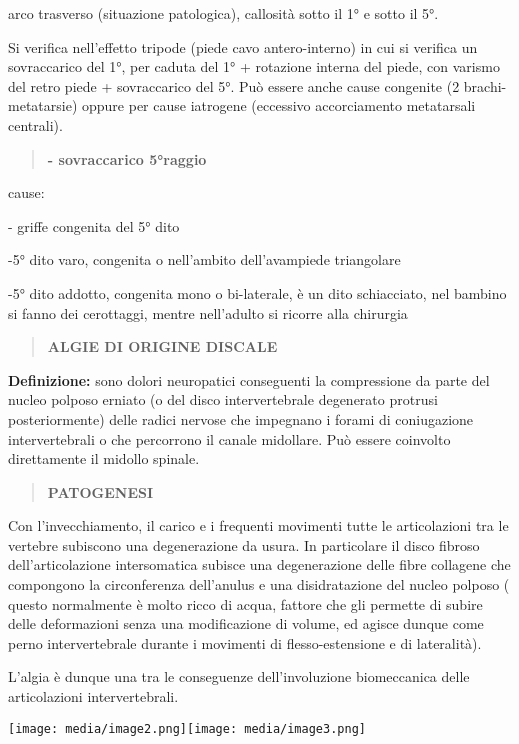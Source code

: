 \documentclass[]{article}
\begin{document}
arco trasverso (situazione patologica), callosità sotto il 1° e sotto il
5°.

Si verifica nell'effetto tripode (piede cavo antero-interno) in cui si
verifica un sovraccarico del 1°, per caduta del 1° + rotazione interna
del piede, con varismo del retro piede + sovraccarico del 5°. Può essere
anche cause congenite (2 brachi-metatarsie) oppure per cause iatrogene
(eccessivo accorciamento metatarsali centrali).

\begin{quote}
\textbf{- sovraccarico 5°raggio}
\end{quote}

cause:

- griffe congenita del 5° dito

-5° dito varo, congenita o nell'ambito dell'avampiede triangolare

-5° dito addotto, congenita mono o bi-laterale, è un dito schiacciato,
nel bambino si fanno dei cerottaggi, mentre nell'adulto si ricorre alla
chirurgia

\begin{quote}
\textbf{ALGIE DI ORIGINE DISCALE}
\end{quote}

\textbf{Definizione:} sono dolori neuropatici conseguenti la
compressione da parte del nucleo polposo erniato (o del disco
intervertebrale degenerato protrusi posteriormente) delle radici nervose
che impegnano i forami di coniugazione intervertebrali o che percorrono
il canale midollare. Può essere coinvolto direttamente il midollo
spinale.

\begin{quote}
\textbf{PATOGENESI}
\end{quote}

Con l'invecchiamento, il carico e i frequenti movimenti tutte le
articolazioni tra le vertebre subiscono una degenerazione da usura. In
particolare il disco fibroso dell'articolazione intersomatica subisce
una degenerazione delle fibre collagene che compongono la circonferenza
dell'anulus e una disidratazione del nucleo polposo ( questo normalmente
è molto ricco di acqua, fattore che gli permette di subire delle
deformazioni senza una modificazione di volume, ed agisce dunque come
perno intervertebrale durante i movimenti di flesso-estensione e di
lateralità).

L'algia è dunque una tra le conseguenze dell'involuzione biomeccanica
delle articolazioni intervertebrali.

\texttt{[image: media/image2.png]}\texttt{[image: media/image3.png]}
\end{document}
